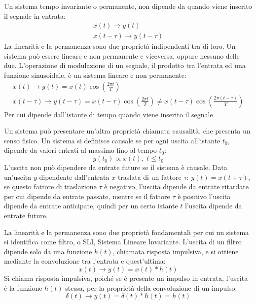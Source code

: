 \documentclass{article}
\numberwithin{equation}{subsection}
\begin{document}
Un sistema tempo invariante o permanente, non dipende da quando viene inserito il segnale in entrata:
\begin{gather}
    x(t)\to y(t)\\
    x(t-\tau)\to y(t-\tau)
\end{gather}
La linearità e la permanenza sono due proprietà indipendenti tra di loro. Un sistema può essere lineare e non permanente e viceversa, oppure nessuno delle due. 
L'operazione di modulazione di un segnale, il prodotto tra l'entrata ed una funzione sinusoidale, è un sistema lineare e non permanente:
\begin{gather*}
    x(t)\to y(t)=x(t)\cos\displaystyle\left(\frac{2\pi t}{T}\right)\\
    x(t-\tau)\to y(t-\tau)=x(t-\tau)\displaystyle\cos\left(\frac{2\pi t}{T}\right)\neq x(t-\tau)\cos\left(\frac{2\pi (t-\tau)}{T}\right)
\end{gather*}
Per cui dipende dall'istante di tempo quando viene inserito il segnale. 


Un sistema può presentare un'altra proprietà chiamata causalità, che presenta un senso fisico. Un sistema si definisce causale se per ogni uscita all'istante $t_0$, dipende 
da valori entrati al massimo fino al tempo $t_0$: 
\begin{equation}
    y(t_0)\propto x(t),\,\,t\leq t_0
\end{equation}
L'uscita non può dipendere da entrate future se il sistema è causale.
Data un'uscita $y$ dipendente dall'entrata $x$ traslata di un fattore $\tau$: $y(t)=x(t+\tau)$, se questo fattore di traslazione $\tau$ è negativo, l'uscita dipende da entrate ritardate 
per cui dipende da entrate passate, mentre se il fattore $\tau$ è positivo l'uscita dipende da entrate anticipate, quindi per un certo istante $t$ l'uscita dipende da entrate 
future. 


La linearità e la permanenza sono due proprietà fondamentali per cui un sistema si identifica come filtro, o SLI, Sistema Lineare Invariante. L'uscita di un filtro dipende 
solo da una funzione $h(t)$, chiamata risposta impulsiva, e si ottiene mediante la convoluzione tra l'entrata e quest'ultima:
\begin{equation}
    x(t)\to y(t)=x(t)*h(t)
\end{equation}
Si chiama risposta impulsiva, poiché se è presente un impulso in entrata, l'uscita è la funzione $h(t)$ stessa, per la proprietà della convoluzione di un impulso:
\begin{equation}
    \delta(t)\to y(t)=\delta(t)*h(t)=h(t)
\end{equation}
\end{document}
